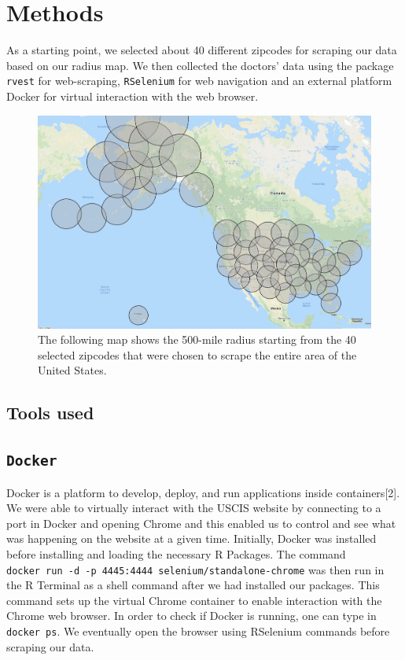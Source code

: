 \documentclass[10pt,letterpaper]{article}
\begin{document}
\section{Methods}\label{methods}

As a starting point, we selected about 40 different zipcodes for
scraping our data based on our radius map. We then collected the
doctors' data using the package \texttt{rvest} for web-scraping,
\texttt{RSelenium} for web navigation and an external platform Docker
for virtual interaction with the web browser.

\begin{figure}
\includegraphics[width=1\linewidth]{RadiusMap} \caption{The following map shows the 500-mile radius starting from the 40 selected zipcodes that were chosen to scrape the entire area of the United States.}\label{fig:unnamed-chunk-1}
\end{figure}

\subsection{Tools used}\label{tools-used}

\subsection{\texorpdfstring{\texttt{Docker}}{Docker}}\label{docker}

Docker is a platform to develop, deploy, and run applications inside
containers{[}2{]}. We were able to virtually interact with the USCIS
website by connecting to a port in Docker and opening Chrome and this
enabled us to control and see what was happening on the website at a
given time. Initially, Docker was installed before installing and
loading the necessary R Packages. The command
\texttt{docker\ run\ -d\ -p\ 4445:4444\ selenium/standalone-chrome} was
then run in the R Terminal as a shell command after we had installed our
packages. This command sets up the virtual Chrome container to enable
interaction with the Chrome web browser. In order to check if Docker is
running, one can type in \texttt{docker\ ps}. We eventually open the
browser using RSelenium commands before scraping our data.
\end{document}
